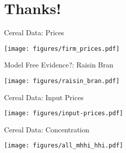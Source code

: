 \section{Thanks!}
\appendix

\begin{frame}[plain]{Cereal Data: Prices}
\begin{center}
\texttt{[image: figures/firm\_prices.pdf]}
\end{center}
\end{frame}


\begin{frame}{Model Free Evidence?: Raisin Bran}
\begin{center}
\texttt{[image: figures/raisin\_bran.pdf]}
\end{center}
\end{frame}


\begin{frame}[plain]{Cereal Data: Input Prices}
\begin{center}
\texttt{[image: figures/input-prices.pdf]}
\end{center}
\end{frame}


\begin{frame}[plain]{Cereal Data: Concentration}
\begin{center}
\texttt{[image: figures/all\_mhhi\_hhi.pdf]}
\end{center}
\end{frame}




